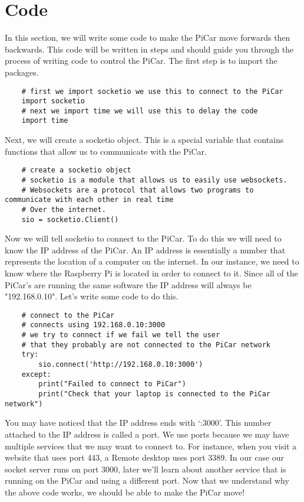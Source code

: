 \documentclass[12pt]{report}
\begin{document}
\section{Code}
In this section, we will write some code to make the PiCar move forwards then backwards. This code will be written in steps and should guide you through the process of writing code to control the PiCar. The first step is to import the packages.
\begin{verbatim}
    # first we import socketio we use this to connect to the PiCar
    import socketio 
    # next we import time we will use this to delay the code
    import time
\end{verbatim}

Next, we will create a socketio object. This is a special variable that contains functions that allow us to communicate with the PiCar.

\begin{verbatim}
    # create a socketio object
    # socketio is a module that allows us to easily use websockets.
    # Websockets are a protocol that allows two programs to communicate with each other in real time
    # Over the internet. 
    sio = socketio.Client()
    \end{verbatim}

Now we will tell socketio to connect to the PiCar. To do this we will need to know the IP address of the PiCar. An IP address is essentially a number that represents the location of a computer on the internet. In our instance, we need to know where the Raspberry Pi is located in order to connect to it. Since all of the PiCar's are running the same software the IP address will always be "192.168.0.10". Let's write some code to do this.

\begin{verbatim}
    # connect to the PiCar
    # connects using 192.168.0.10:3000
    # we try to connect if we fail we tell the user 
    # that they probably are not connected to the PiCar network
    try:
        sio.connect('http://192.168.0.10:3000')
    except:
        print("Failed to connect to PiCar")
        print("Check that your laptop is connected to the PiCar network")
    \end{verbatim}

You may have noticed that the IP address ends with ‘:3000’. This number attached to the IP address is called a port. We use ports because we may have multiple services that we may want to connect to. For instance, when you visit a website that uses port 443, a Remote desktop uses port 3389. In our case our socket server runs on port 3000, later we'll learn about another service that is running on the PiCar and using a different port. Now that we understand why the above code works, we should be able to make the PiCar move!
\end{document}
